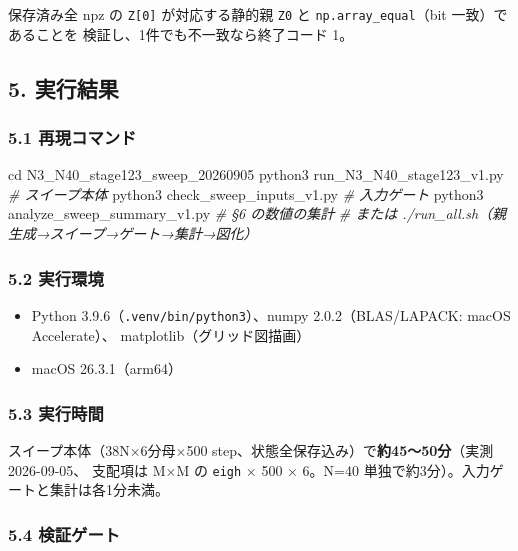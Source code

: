 \documentclass[
  a4paper,
]{ltjsarticle}
\newenvironment{Shaded}{}{}
\newcommand{\BuiltInTok}[1]{\textcolor[rgb]{0.00,0.50,0.00}{#1}}
\newcommand{\CommentTok}[1]{\textcolor[rgb]{0.38,0.63,0.69}{\textit{#1}}}
\newcommand{\ExtensionTok}[1]{#1}
\newcommand{\NormalTok}[1]{#1}
\providecommand{\tightlist}{%
  \setlength{\itemsep}{0pt}\setlength{\parskip}{0pt}}
\begin{document}
保存済み全 npz の \texttt{Z{[}0{]}} が対応する静的親 \texttt{Z0} と
\texttt{np.array\_equal}（bit 一致）であることを
検証し、1件でも不一致なら終了コード 1。

\subsection{5. 実行結果}\label{ux5b9fux884cux7d50ux679c}

\subsubsection{5.1
再現コマンド}\label{ux518dux73feux30b3ux30deux30f3ux30c9}

\begin{Shaded}
\begin{Highlighting}[]
\BuiltInTok{cd}\NormalTok{ N3\_N40\_stage123\_sweep\_20260905}
\ExtensionTok{python3}\NormalTok{ run\_N3\_N40\_stage123\_v1.py        }\CommentTok{\# スイープ本体}
\ExtensionTok{python3}\NormalTok{ check\_sweep\_inputs\_v1.py         }\CommentTok{\# 入力ゲート}
\ExtensionTok{python3}\NormalTok{ analyze\_sweep\_summary\_v1.py      }\CommentTok{\# §6 の数値の集計}
\CommentTok{\# または ./run\_all.sh（親生成→スイープ→ゲート→集計→図化）}
\end{Highlighting}
\end{Shaded}

\subsubsection{5.2 実行環境}\label{ux5b9fux884cux74b0ux5883}

\begin{itemize}
\tightlist
\item
  Python 3.9.6（\texttt{.venv/bin/python3}）、numpy 2.0.2（BLAS/LAPACK:
  macOS Accelerate）、 matplotlib（グリッド図描画）
\item
  macOS 26.3.1（arm64）
\end{itemize}

\subsubsection{5.3 実行時間}\label{ux5b9fux884cux6642ux9593}

スイープ本体（38N×6分母×500
step、状態全保存込み）で\textbf{約45〜50分}（実測 2026-09-05、 支配項は
M×M の \texttt{eigh} × 500 × 6。N=40
単独で約3分）。入力ゲートと集計は各1分未満。

\subsubsection{5.4 検証ゲート}\label{ux691cux8a3cux30b2ux30fcux30c8}
\end{document}

